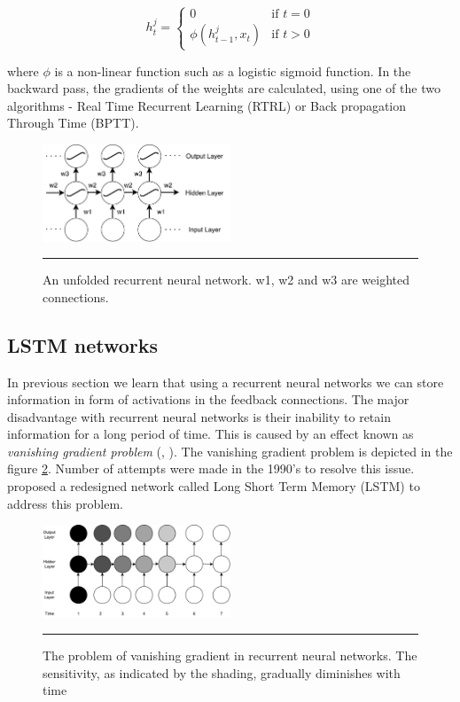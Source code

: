                 \[
                 h^j_{t} =
                  \begin{cases}
                   0    & \text{if } t = 0 \\
                   \phi(h^j_{t-1},x_{t})    & \text{if } t > 0
                  \end{cases}
                \]

where $\phi$ is a non-linear function such as a logistic sigmoid function.
In the backward pass, the gradients of the weights are calculated, using one of the two
algorithms - Real Time Recurrent Learning (RTRL) or Back propagation Through Time (BPTT).

\begin{figure}[htbp]
  \centering
    \includegraphics[width=0.5\textwidth,height=0.5\textheight,keepaspectratio]
    {Figures/unfolded-rnn.pdf}
    \rule{35em}{0.5pt}
  \caption[An unfolded RNN] {An unfolded recurrent neural network. w1, w2 and w3 are weighted
  connections. }
  \label{fig:unfoldedRNN}
\end{figure}

\subsection{LSTM networks}
In previous section we learn that using a recurrent neural networks we can store information in
form of activations in the feedback connections. The major disadvantage with recurrent neural
networks is their inability to retain information for a long period of time. This is caused by an
effect known as \emph{vanishing gradient problem} (\citet{bengio1994learning},
\citet{hochreiter2001gradient}). The vanishing gradient problem is depicted in the figure
\ref{fig:vanishingGradient}. Number of attempts were made in the 1990's to resolve this issue.
\citet{hochreiter1997long} proposed a redesigned network called Long Short Term Memory (LSTM) to
address this problem.

\begin{figure}[htbp]
  \centering
    \includegraphics[width=0.5\textwidth,height=0.5\textheight,keepaspectratio]{Figures/vanishing-gradient.pdf}
    \rule{35em}{0.5pt}
  \caption[Vanishing Gradient] {The problem of vanishing gradient in recurrent neural networks.
  The sensitivity, as indicated by the shading, gradually diminishes with time}
  \label{fig:vanishingGradient}
\end{figure}


